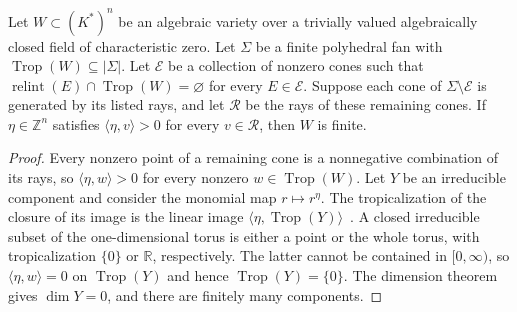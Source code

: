 \documentclass[11pt]{amsart}
\newcommand{\Z}{\mathbb{Z}}
\theoremstyle{definition}\newtheorem{definition}[theorem]{Definition}\theoremstyle{remark}\newtheorem{remark}[theorem]{Remark}
\newcommand{\Trop}{\operatorname{Trop}}\newcommand{\inn}{\operatorname{in}}\newcommand{\Q}{\mathbb{Q}}
\begin{document}
\begin{lemma}\label{lem:C}
Let $W\subset(K^*)^n$ be an algebraic variety over a trivially valued algebraically closed field of characteristic zero. Let $\Sigma$ be a finite polyhedral fan with $\Trop(W)\subseteq|\Sigma|$. Let $\mathcal E$ be a collection of nonzero cones such that $\operatorname{relint}(E)\cap\Trop(W)=\varnothing$ for every $E\in\mathcal E$. Suppose each cone of $\Sigma\setminus\mathcal E$ is generated by its listed rays, and let $\mathcal R$ be the rays of these remaining cones. If $\eta\in\Z^n$ satisfies $\langle\eta,v\rangle>0$ for every $v\in\mathcal R$, then $W$ is finite.
\end{lemma}
\begin{proof}
Every nonzero point of a remaining cone is a nonnegative combination of its rays, so $\langle\eta,w\rangle>0$ for every nonzero $w\in\Trop(W)$. Let $Y$ be an irreducible component and consider the monomial map $r\mapsto r^\eta$. The tropicalization of the closure of its image is the linear image $\langle\eta,\Trop(Y)\rangle$~\citep[Corollary~3.2.13]{MS}. A closed irreducible subset of the one-dimensional torus is either a point or the whole torus, with tropicalization $\{0\}$ or $\mathbb R$, respectively. The latter cannot be contained in $[0,\infty)$, so $\langle\eta,w\rangle=0$ on $\Trop(Y)$ and hence $\Trop(Y)=\{0\}$. The dimension theorem~\citep[Theorem~3.3.5]{MS} gives $\dim Y=0$, and there are finitely many components.
\end{proof}
\end{document}
